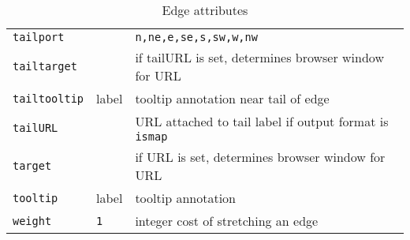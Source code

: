 \documentclass[11pt]{article}
\begin{document}
\begin{table}[p]
\begin{tabular}[t]{|l|l|p{3.5in}|}
{\tt tailport} & & {\tt n,ne,e,se,s,sw,w,nw}\\
{\tt tailtarget} & & if tailURL is set, determines browser window for URL \\
{\tt tailtooltip} & label & tooltip annotation near tail of edge \\
{\tt tailURL} & & URL attached to tail label if output format is {\tt ismap} \\
{\tt target} & & if URL is set, determines browser window for URL \\
{\tt tooltip} & label & tooltip annotation \\
{\tt weight} & {\tt 1} & integer cost of stretching an edge \\
\hline
\end{tabular}
\caption{Edge attributes}
\label{tab:eattr}
\end{table}
\end{document}
